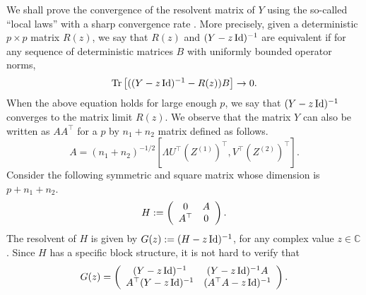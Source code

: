 We shall prove the convergence of the resolvent matrix of $Y$ using the so-called ``local laws'' with a sharp convergence rate \cite{isotropic,erdos2017dynamical,Anisotropic}.
More precisely, given a deterministic $p\times p$ matrix $R(z)$, we say that $R(z)$ and $(Y-z\operatorname{Id})^{-1}$ are equivalent if for any sequence of deterministic matrices $B$ with uniformly bounded operator norms,
$$\operatorname{Tr}\left[((Y-z\operatorname{Id})^{-1}-R(z))B\right]\to 0.$$
When the above equation holds for large enough $p$, we say that $(Y-z\operatorname{Id})^{-1}$ converges to the matrix limit $R(z)$.
We observe that the matrix $Y$ can also be written as $A A^{\top}$ for a $p$ by $n_1 + n_2$ matrix defined as follows.
	\[ A = (n_1+ n_2)^{-1/2} [\Lambda U^\top (Z^{(1)})^\top,V^\top (Z^{(2)})^\top]. \]
Consider the following symmetric and square matrix whose dimension is $p + n_1 + n_2$.
 \begin{equation}\label{linearize_block}
    H \define \left( {\begin{array}{*{20}c}
   0 & A  \\
   A^{\top} & 0
   \end{array}} \right).
 \end{equation}
The resolvent of $H$ is given by $G(z) := (H - z\operatorname{Id})^{-1}$, for any complex value $z\in \mathbb C$.
Since $H$ has a specific block structure, it is not hard to verify that
	\begin{equation*} %
	  G(z) =  \left( {\begin{array}{*{20}c}
			(Y - z\id)^{-1} & (Y - z\id)^{-1} A  \\
      A^\top (Y - z\id)^{-1} & (A^\top A - z\id)^{-1}
		\end{array}} \right).%
  \end{equation*}

